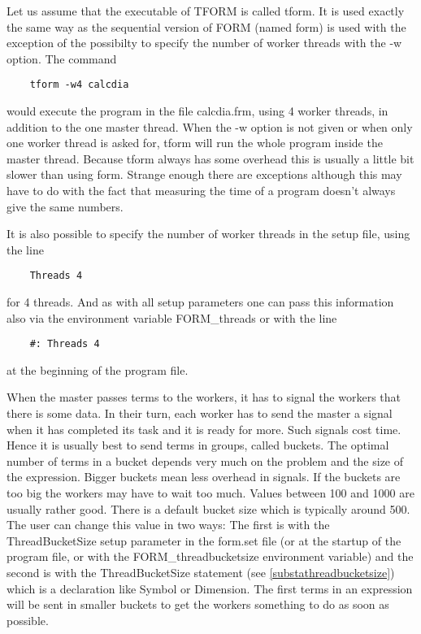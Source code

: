 Let us assume that the executable of TFORM is called tform. It 
is used exactly the same way as the sequential version of FORM (named form) 
is used with the exception of the possibilty to specify the number of 
worker threads with the -w option. The command
\begin{verbatim}
    tform -w4 calcdia
\end{verbatim}
would execute the program in the file calcdia.frm, using 4 worker threads, 
in addition to the one master thread. When the -w option is not given or 
when only one worker thread is asked for, tform will run the whole program 
inside the master thread. Because tform always has some 
overhead this is usually a little bit slower than using form. Strange 
enough there are exceptions although this may have to do with the fact that 
measuring the time of a program doesn't always give the same numbers.

It is also possible to specify the number of worker threads in the setup 
file, using the line
\begin{verbatim}
    Threads 4
\end{verbatim}
for 4 threads. And as with all setup parameters one can pass this 
information also via the environment variable FORM\_threads or with the line
\begin{verbatim}
    #: Threads 4
\end{verbatim}
at the beginning of the program file.

When the master passes terms to the workers, it has to signal 
the workers that there is some data. In their turn, each worker has to send 
the master a signal when it has completed its task and it is ready for 
more. Such signals cost time. Hence it is usually best to send terms in 
groups, called buckets. The optimal number of terms in a 
bucket depends very much on the problem and the size of the expression. 
Bigger buckets mean less overhead in signals. If the buckets are too big 
the workers may have to wait too much. Values between 100 and 1000 are 
usually rather good. There is a default bucket size which is typically 
around 500. The user can change this value in two ways: The first is with 
the ThreadBucketSize setup parameter in the 
form.set file (or at the startup of the program file, or with the 
FORM\_threadbucketsize environment variable) and the second is with the 
ThreadBucketSize statement (see \ref{substathreadbucketsize}) which is a 
declaration like Symbol or Dimension. The first terms in an expression will 
be sent in smaller buckets to get the workers something to do as soon as 
possible.

